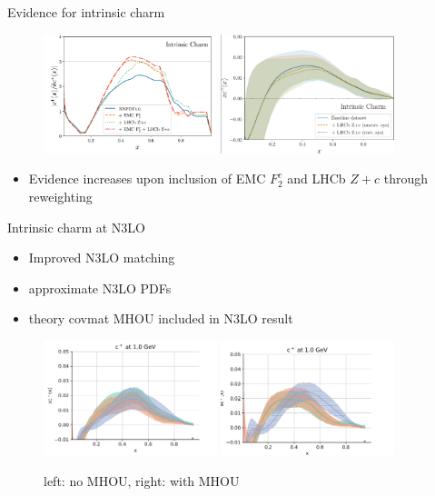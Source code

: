 \documentclass[aspectratio=43, 8pt,t]{beamer}
\begin{document}
\begin{frame}{Evidence for intrinsic charm}
  \begin{figure}
    \includegraphics[width=0.45\textwidth]{ic_f2c_zc.png}
    \includegraphics[width=0.45\textwidth]{lhcb_reweithed.png}
  \end{figure}
  \begin{itemize}
    \item Evidence increases upon inclusion of EMC $F_2^c$ and LHCb $Z+c$ through reweighting
  \end{itemize}
\end{frame}

\begin{frame}{Intrinsic charm at N3LO}
  \begin{itemize}
    \item Improved N3LO matching
    \item approximate N3LO PDFs
    \item theory covmat MHOU included in N3LO result
  \end{itemize}
  \begin{figure}
    \includegraphics[width=0.45\textwidth]{n3lo_charm.png}
    \includegraphics[width=0.45\textwidth]{n3lo_charm_mhou.png}
    \caption*{left: no MHOU, right: with MHOU}
  \end{figure}
\end{frame}
\end{document}
